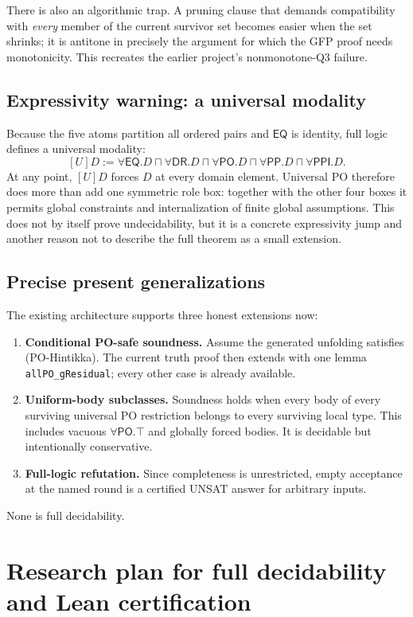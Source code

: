 \documentclass[11pt]{article}
\newcommand{\PP}{\mathsf{PP}}
\newcommand{\PPI}{\mathsf{PPI}}
\newcommand{\PO}{\mathsf{PO}}
\newcommand{\DR}{\mathsf{DR}}
\newcommand{\EQ}{\mathsf{EQ}}
\newcommand{\code}[1]{\texttt{#1}}
\begin{document}
There is also an algorithmic trap. A pruning clause that demands compatibility with
\emph{every} member of the current survivor set becomes easier when the set shrinks;
it is antitone in precisely the argument for which the GFP proof needs monotonicity.
This recreates the earlier project's nonmonotone-Q3 failure.

\subsection{Expressivity warning: a universal modality}

Because the five atoms partition all ordered pairs and $\EQ$ is identity, full logic
defines a universal modality:
\[
  [U]D :=
  \forall\EQ.D\sqcap\forall\DR.D\sqcap\forall\PO.D
  \sqcap\forall\PP.D\sqcap\forall\PPI.D.
\]
At any point, $[U]D$ forces $D$ at every domain element. Universal PO therefore does
more than add one symmetric role box: together with the other four boxes it permits
global constraints and internalization of finite global assumptions. This does not by
itself prove undecidability, but it is a concrete expressivity jump and another reason
not to describe the full theorem as a small extension.

\subsection{Precise present generalizations}

The existing architecture supports three honest extensions now:
\begin{enumerate}
  \item \textbf{Conditional PO-safe soundness.} Assume the generated unfolding
  satisfies (PO-Hintikka). The current truth proof then extends with one lemma
  \code{allPO\_gResidual}; every other case is already available.
  \item \textbf{Uniform-body subclasses.} Soundness holds when every body of every
  surviving universal PO restriction belongs to every surviving local type. This
  includes vacuous $\forall\PO.\top$ and globally forced bodies. It is decidable but
  intentionally conservative.
  \item \textbf{Full-logic refutation.} Since completeness is unrestricted, empty
  acceptance at the named round is a certified UNSAT answer for arbitrary inputs.
\end{enumerate}
None is full decidability.

\section{Research plan for full decidability and Lean certification}
\end{document}
